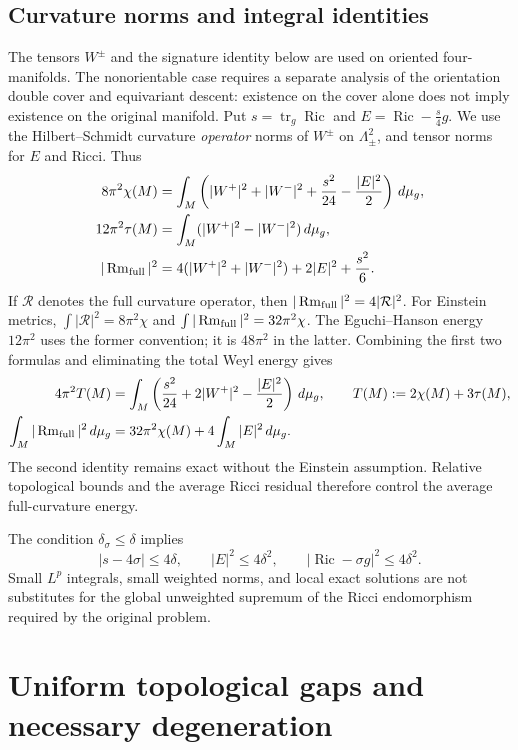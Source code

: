 \documentclass[a4paper,11pt]{article}
\numberwithin{equation}{section}
\theoremstyle{definition}
\newcommand{\Ric}{\operatorname{Ric}}
\newcommand{\Rm}{\operatorname{Rm}}
\newcommand{\tr}{\operatorname{tr}}
\newcommand{\dd}{\,d\mu_g}
\begin{document}
\subsection{Curvature norms and integral identities}
The tensors $W^\pm$ and the signature identity below are used on oriented four-manifolds. The nonorientable case requires a separate analysis of the orientation double cover and equivariant descent: existence on the cover alone does not imply existence on the original manifold. Put $s=\tr_g\Ric$ and $E=\Ric-\frac{s}{4}g$. We use the Hilbert--Schmidt curvature \emph{operator} norms of $W^\pm$ on $\Lambda^2_\pm$, and tensor norms for $E$ and Ricci. Thus
\begin{align}
8\pi^2\chi(M)&=\int_M\left(|W^+|^2+|W^-|^2+\frac{s^2}{24}-\frac{|E|^2}{2}\right)\dd,\label{eq:CGB}\\
12\pi^2\tau(M)&=\int_M(|W^+|^2-|W^-|^2)\dd,\label{eq:signature}\\
|\Rm_{\rm full}|^2&=4(|W^+|^2+|W^-|^2)+2|E|^2+\frac{s^2}{6}.
\end{align}
If $\mathcal R$ denotes the full curvature operator, then $|\Rm_{\rm full}|^2=4|\mathcal R|^2$. For Einstein metrics, $\int|\mathcal R|^2=8\pi^2\chi$ and $\int|\Rm_{\rm full}|^2=32\pi^2\chi$. The Eguchi--Hanson energy $12\pi^2$ uses the former convention; it is $48\pi^2$ in the latter.
Combining the first two formulas and eliminating the total Weyl energy gives
\begin{align}
4\pi^2T(M)&=\int_M\left(\frac{s^2}{24}+2|W^+|^2-\frac{|E|^2}{2}\right)\dd,
\qquad T(M):=2\chi(M)+3\tau(M),\label{eq:relative-cw}\\
\int_M|\Rm_{\rm full}|^2\dd&=32\pi^2\chi(M)+4\int_M|E|^2\dd.
\label{eq:relative-full-energy}
\end{align}
The second identity remains exact without the Einstein assumption. Relative topological bounds and the average Ricci residual therefore control the average full-curvature energy.

The condition $\delta_\sigma\le\delta$ implies
\begin{equation}
 |s-4\sigma|\le4\delta,\qquad |E|^2\le4\delta^2,\qquad
 |\Ric-\sigma g|^2\le4\delta^2.
\end{equation}
Small $L^p$ integrals, small weighted norms, and local exact solutions are not substitutes for the global unweighted supremum of the Ricci endomorphism required by the original problem.

\section{Uniform topological gaps and necessary degeneration}
\end{document}
